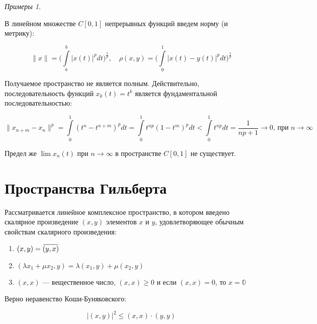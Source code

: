 \documentclass[12pt,a4paper,titlepage,oneside]{book}
\newcommand{\overbar}[1]{\mkern 1.5mu\overline{\mkern-1.5mu#1\mkern-1.5mu}\mkern 1.5mu}
\theoremstyle{definition}
\theoremstyle{plain}
\theoremstyle{break}
\theoremstyle{remark}
\theoremstyle{remark}
\theoremstyle{remark}
\newtheorem*{examples}{Примеры}
\theoremstyle{remark}
\theoremstyle{plain}
\theoremstyle{plain}
\begin{document}
\begin{examples}
\begin{enumerate}
	В линейном множестве $C[0,1]$ непрерывных функций введем норму (и метрику):

	\begin{equation*}
	\lVert x\rVert = \Big(\int\limits_a^b\lvert x(t)\rvert^pdt \Big)^{\frac{1}{p}},\quad\rho(x,y) = \Big(\int\limits_0^1\lvert x(t)-y(t)\rvert^pdt \Big)^{\frac{1}{p}}
	\end{equation*}

	Получаемое пространство не является полным. Действительно, последовательность функций $x_k(t)=t^k$ является фундаментальной последовательностью:

	\begin{equation*}
	\lVert x_{n+m}-x_n\rVert^p=\int\limits_0^1(t^n-t^{n+m})^pdt=\int\limits_0^1t^{np}(1-t^m)^pdt<\int\limits_0^1t^{np}dt=\frac{1}{np+1}\to0 \mbox{, при } n \to\infty
	\end{equation*}

	Предел же $\lim x_n(t)$ при $n\to\infty$ в пространстве $C[0,1]$ не существует.

\end{enumerate}

\end{examples}

\section{Пространства Гильберта}

Рассматривается линейное комплексное пространство, в котором введено скалярное произведение $(x, y)$ элементов $x$ и $y$, удовлетворяющее обычным свойствам скалярного произведения:

\begin{enumerate}

    \item $(x, y) = \overbar{(y, x)}$

    \item $(\lambda x_1 + \mu x_2, y) = \lambda (x_1, y) + \mu (x_2, y)$

    \item $(x, x)$ --- вещественное число, $(x, x) \geqslant 0$ и если $(x, x) = 0$, то $x = \mathbb{0}$

\end{enumerate}

Верно неравенство Коши-Буняковского:

\begin{equation*}
\lvert (x, y) \rvert ^2 \leqslant (x, x) \cdot (y, y)
\end{equation*}
\end{document}
